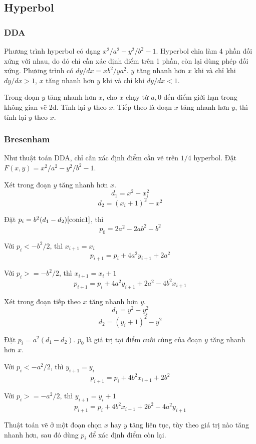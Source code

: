 \documentclass[12pt]{article}
\begin{document}
\subsection{Hyperbol}

\subsubsection{DDA}
Phương trình hyperbol có dạng \(x^2/a^2 - y^2/b^2 - 1\).
Hyperbol chia làm 4 phần đối xứng với nhau,
do đó chỉ cần xác định điểm trên 1 phần, còn lại dùng phép đối xứng.
Phương trình có \(dy/dx = xb^2/ya^2\).
\(y\) tăng nhanh hơn \(x\) khi và chỉ khi \(dy/dx > 1\),
\(x\) tăng nhanh hơn \(y\) khi và chỉ khi \(dy/dx < 1\).

Trong đoạn \(y\) tăng nhanh hơn \(x\), cho \(x\) chạy từ \(a, 0\)
đến điểm giới hạn trong không gian vẽ 2d. Tính lại \(y\) theo \(x\).
Tiếp theo là đoạn \(x\) tăng nhanh hơn \(y\), thì tính lại \(y\) theo \(x\).

\subsubsection{Bresenham}
Như thuật toán DDA, chỉ cần xác định điểm cần vẽ trên \(1/4\) hyperbol.
Đặt \(F(x, y) = x^2/a^2 - y^2/b^2 - 1\).

Xét trong đoạn \(y\) tăng nhanh hơn \(x\).
\[d_1 = x^2 - x_i^2\]
\[d_2 = (x_i + 1)^2 - x^2\]

Đặt \(p_i = b^2 (d_1 - d_2) \cite{conic1} \), thì
\[p_0 = 2a^2 - 2ab^2 - b^2\]

Với \(p_i < -b^2/2\), thì \(x_{i+1} = x_i\)
\[p_{i+1} = p_i + 4a^2 y_{i+1} + 2a^2\]

Với \(p_i >= -b^2/2\), thì \(x_{i+1} = x_i + 1\)
\[p_{i+1} = p_i + 4a^2 y_{i+1} + 2a^2 - 4b^2 x_{i+1}\]

Xét trong đoạn tiếp theo \(x\) tăng nhanh hơn \(y\).
\[d_1 = y^2 - y_i^2\]
\[d_2 = (y_i + 1)^2 - y^2\]

Đặt \(p_i = a^2 (d_1 - d_2)\).
\(p_0\) là giá trị tại điểm cuối cùng của đoạn \(y\) tăng nhanh hơn \(x\).

Với \(p_i < -a^2/2\), thì \(y_{i+1} = y_i\)
\[p_{i+1} = p_i + 4b^2 x_{i+1} + 2b^2\]

Với \(p_i >= -a^2/2\), thì \(y_{i+1} = y_i + 1\)
\[p_{i+1} = p_i + 4b^2 x_{i+1} + 2b^2 - 4a^2 y_{i+1}\]

Thuật toán vẽ ở một đoạn chọn \(x\) hay \(y\) tăng liên tục,
tùy theo giá trị nào tăng nhanh hơn,
sau đó dùng \(p_i\) để xác định điểm còn lại.
\end{document}
